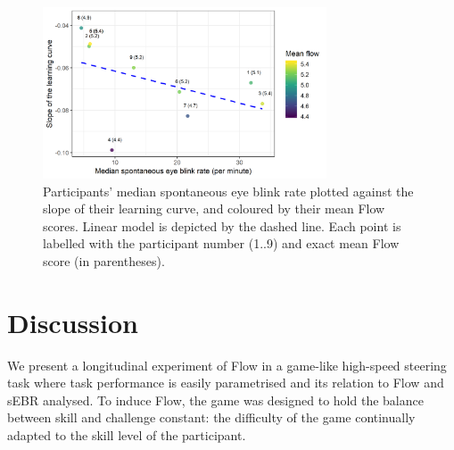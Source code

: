 \documentclass[fleqn,10pt]{wlscirep}
\newcommand{\nicewidth}{0.75\textwidth}
\begin{document}

\begin{figure}[!ht]
	\centering
	\includegraphics[width=\nicewidth]{lcurve_sbr_flowRL2}
	\caption{Participants' median spontaneous eye blink rate plotted against the slope of their learning curve, and coloured by their mean Flow scores. Linear model is depicted by the dashed line. Each point is labelled with the participant number (1..9) and exact mean Flow score (in parentheses).}
	\label{fig:EBRvLC}
\end{figure}


\section*{Discussion}
We present a longitudinal experiment of Flow in a game-like high-speed steering task where task performance is easily parametrised and its relation to Flow and sEBR analysed. %
To induce Flow, the game was designed to hold the balance between skill and challenge constant: the difficulty of the game continually adapted to the skill level of the participant.
\end{document}
